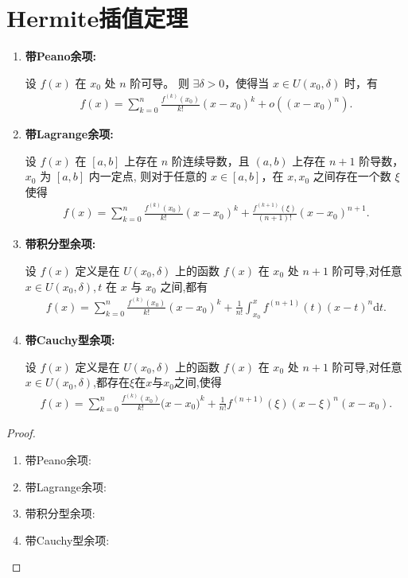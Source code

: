 \documentclass[../../main.tex]{subfiles}
\begin{document}
\section{Hermite插值定理}

\begin{theorem}[Taylor定理]\label{theorem:带各种余项的Taylor公式}
\begin{enumerate}[(1)]
\item \textbf{带Peano余项:}

设 $f(x)$ 在 $x_0$ 处 $n$ 阶可导。
则 $\exists \delta > 0$，使得当 $x \in U(x_0, \delta)$ 时，有
\begin{align*}
f(x) = \sum_{k=0}^{n} \frac{f^{(k)}(x_0)}{k!} (x - x_0)^k + o((x - x_0)^n).
\end{align*}

\item \textbf{带Lagrange余项:}

设 $f(x)$ 在 $[a, b]$ 上存在 $n$ 阶连续导数，且 $(a, b)$ 上存在 $n + 1$ 阶导数，$x_0$ 为 $[a, b]$ 内一定点,
则对于任意的 $x \in [a, b]$，在 $x, x_0$ 之间存在一个数 $\xi$ 使得
\begin{align*}
f(x) = \sum_{k=0}^{n} \frac{f^{(k)}(x_0)}{k!} (x - x_0)^k + \frac{f^{(k+1)}(\xi)}{(n + 1)!} (x - x_0)^{n+1}.
\end{align*}

\item \textbf{带积分型余项:}

设 $f(x)$ 定义是在 $U(x_0, \delta)$ 上的函数 $f(x)$ 在 $x_0$ 处 $n + 1$ 阶可导,对任意$x\in U(x_0, \delta)$,$\,t$ 在 $x$ 与 $x_0$ 之间,都有
\begin{align*}
f(x) = \sum_{k=0}^{n} \frac{f^{(k)}(x_0)}{k!} (x - x_0)^k + \frac{1}{n!} \int_{x_0}^{x} f^{(n+1)}(t) (x - t)^n \mathrm{d}t.
\end{align*}

\item \textbf{带Cauchy型余项:}

设 $f(x)$ 定义是在 $U(x_0, \delta)$ 上的函数 $f(x)$ 在 $x_0$ 处 $n + 1$ 阶可导,对任意$x\in U(x_0, \delta)$,都存在$\xi$在$x$与$x_0$之间,使得
\begin{align*}
f(x)=\sum_{k=0}^n{\frac{f^{(k)}(x_0)}{k!}(x}-x_0)^k+\frac{1}{n!}f^{\left( n+1 \right)}\left( \xi \right) \left( x-\xi \right) ^n\left( x-x_0 \right) .
\end{align*}
\end{enumerate}
\end{theorem}
\begin{proof}
\begin{enumerate}[(1)]
\item {\heiti 带Peano余项:}



\item  {\heiti 带Lagrange余项:}



\item {\heiti 带积分型余项:}



\item {\heiti 带Cauchy型余项:}


\end{enumerate}
\end{proof}
\end{document}
